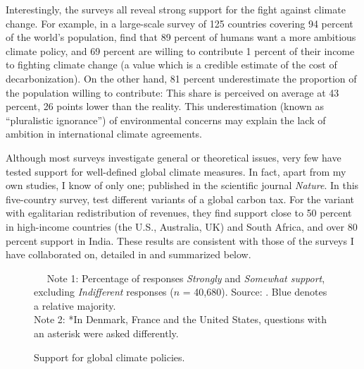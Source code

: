 \documentclass[a5paper,english,openany]{memoir}
\begin{document}
Interestingly, %
the surveys all reveal strong support for the fight against climate change. For example, in a large-scale survey of 125 countries covering 94 percent of the world's population, \citet{andre_globally_2024} find that 89 percent of humans want a more ambitious climate policy, and 69 percent are willing to contribute 1 percent of their income to fighting climate change (a value which is a credible estimate of the cost of decarbonization). 
On the other hand, 81 percent underestimate the proportion of the population willing to contribute: %
This share is perceived on average at 43 percent, 26 points lower than the reality. This underestimation (known as ``pluralistic ignorance'') of environmental concerns may explain the lack of ambition in international climate agreements. %

Although %
most surveys investigate general or theoretical issues, very few have tested support for %
well-defined global climate measures. In fact, apart from my own studies, I know of only one; %
published in the scientific journal \textit{Nature}. In this five-country survey, \citet{carattini_how_2019} test different variants of a global carbon tax. For the variant with egalitarian redistribution of revenues, they find support close to 50 percent in high-income countries (the U.S., Australia, UK) and South Africa, and over 80 percent support in India. These results are consistent with those of the surveys I have collaborated on, detailed in \citet{fabre_international_2023} and summarized %
below. 

\begin{figure}[b!] %
  \caption[Support for global climate policies]{Support for global climate policies.} 
  \label{fig:oecd} %
  {\footnotesize $\quad$ Note 1: Percentage of responses \textit{Strongly} and \textit{Somewhat support}, excluding \textit{Indifferent} responses ($n$ = 40,680). Source: \citet{fabre_international_2023}. %
  Blue denotes a relative majority. %
  \\ Note 2: *In Denmark, France and the United States, questions with an asterisk were asked differently. %
  } 
\end{figure}
\end{document}
